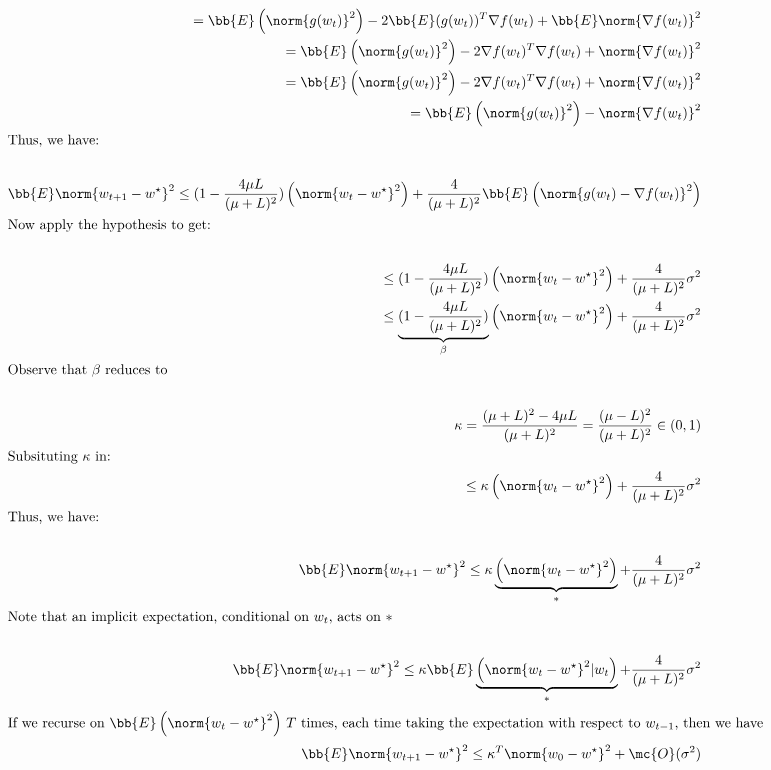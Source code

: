 \documentclass[../main.tex]{subfiles}
\begin{document}
\begin{align*}
     = \bb{E}\left( \norm{g(w_t)}^2\right) - 2\bb{E}(g(w_t))^T\nabla f(w_t) + \bb{E}\norm{\nabla f(w_t)}^2  \\
     = \bb{E}\left( \norm{g(w_t)}^2\right) - 2\nabla f(w_t)^T\nabla f(w_t) + \norm{\nabla f(w_t)}^2  \\
     = \bb{E}\left( \norm{g(w_t)}^2\right) - 2\nabla f(w_t)^T\nabla f(w_t) + \norm{\nabla f(w_t)}^2  \\
     = \bb{E}\left( \norm{g(w_t)}^2\right) - \norm{\nabla f(w_t)}^2  \\
     \intertext{Thus, we have:} \\
     \bb{E} \norm{w_{t+1} - w^{\star}}^2 \leq (1 - \frac{4\mu L }{(\mu + L)^2})\left( \norm{w_{t} - w^{\star}}^2 \right) + \frac{4}{(\mu + L)^2}\bb{E}\left(\norm{g(w_t) - \nabla f(w_t)}^2\right)  \\
     \intertext{Now apply the hypothesis to get:} \\
     \leq (1 - \frac{4\mu L }{(\mu + L)^2})\left( \norm{w_{t} - w^{\star}}^2 \right) + \frac{4}{(\mu + L)^2}\sigma^2  \\
     \leq \underbrace{(1 - \frac{4\mu L }{(\mu + L)^2})}_{\beta}\left( \norm{w_{t} - w^{\star}}^2 \right) + \frac{4}{(\mu + L)^2}\sigma^2  \\
     \intertext{Observe that $\beta$ reduces to} \\
     \kappa = \frac{(\mu + L)^2 - 4\mu L }{(\mu + L)^2} = \frac{(\mu - L)^2 }{(\mu + L)^2} \in (0,1) \\
     \intertext{Subsituting $\kappa$ in:}
     \leq \kappa \left( \norm{w_{t} - w^{\star}}^2 \right) + \frac{4}{(\mu + L)^2}\sigma^2  \\
     \intertext{Thus, we have:} \\
     \bb{E} \norm{w_{t+1} - w^{\star}}^2 \leq \kappa \underbrace{\left( \norm{w_{t} - w^{\star}}^2 \right)}_{\ast} + \frac{4}{(\mu + L)^2}\sigma^2  \\
     \intertext{Note that an implicit expectation, conditional on $w_{t}$, acts on $\ast$} \\
     \bb{E} \norm{w_{t+1} - w^{\star}}^2 \leq \kappa \bb{E}\underbrace{\left( \norm{w_{t} - w^{\star}}^2 | w_{t} \right)}_{\ast} + \frac{4}{(\mu + L)^2}\sigma^2  \\
     \intertext{If we recurse on $\bb{E}\left(\norm{w_t - w^{\star}}^2\right)$ $T$ times, each time taking the expectation with respect to $w_{t-1}$, then we have}
     \bb{E} \norm{w_{t+1} - w^{\star}}^2 \leq \kappa^T \norm{w_{0} - w^{\star}}^2+ \mc{O}(\sigma^2)  \\
\end{align*}
\end{document}
